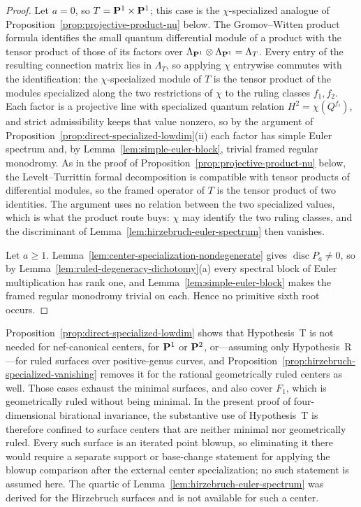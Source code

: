 \begin{proof}
Let \(a=0\), so \(T=\mathbf P^1\times\mathbf P^1\); this case is the \(\chi\)-specialized
analogue of Proposition~\ref{prop:projective-product-nu} below.  The
Gromov--Witten product formula
\cite{BehrendProduct} identifies the small quantum differential module of a
product with the tensor product of those of its factors over
\(\Lambda_{\mathbf P^1}\otimes\Lambda_{\mathbf P^1}=\Lambda_T\).  Every entry of the
resulting connection matrix lies in \(\Lambda_T\), so applying \(\chi\)
entrywise commutes with the identification: the \(\chi\)-specialized module of
\(T\) is the tensor product of the modules specialized along the two
restrictions of \(\chi\) to the ruling classes \(f_1,f_2\).  Each factor is a
projective line with specialized quantum relation \(H^2=\chi(Q^{f_i})\), and strict
admissibility keeps that value nonzero, so by the argument of
Proposition~\ref{prop:direct-specialized-lowdim}(ii) each factor has simple Euler
spectrum and, by Lemma~\ref{lem:simple-euler-block}, trivial framed regular
monodromy.  As in the proof of
Proposition~\ref{prop:projective-product-nu} below, the Levelt--Turrittin formal
decomposition is compatible with tensor products of differential modules, so the
framed operator of \(T\) is the tensor product of two identities.  The argument uses no
relation between the two specialized values, which is what the product route
buys: \(\chi\) may identify the two ruling classes, and the discriminant of
Lemma~\ref{lem:hirzebruch-euler-spectrum} then vanishes.

Let \(a\ge1\).  Lemma~\ref{lem:center-specialization-nondegenerate} gives
\(\operatorname{disc}P_a\ne0\), so by
Lemma~\ref{lem:ruled-degeneracy-dichotomy}(a) every spectral block of Euler
multiplication has rank one, and Lemma~\ref{lem:simple-euler-block} makes the
framed regular monodromy trivial on each.  Hence no primitive sixth root occurs.
\end{proof}

\begin{remark}
\label{rem:tagging-scope}
Proposition~\ref{prop:direct-specialized-lowdim} shows that
Hypothesis~T is not needed for nef-canonical centers, for \(\mathbf P^1\) or
\(\mathbf P^2\), or---assuming only Hypothesis~R---for ruled surfaces over
positive-genus curves, and
Proposition~\ref{prop:hirzebruch-specialized-vanishing} removes it for the
rational geometrically ruled centers as well.  Those cases exhaust the minimal
surfaces, and also cover \(F_1\), which is geometrically ruled without being
minimal.  In the present proof of four-dimensional birational invariance, the
substantive use of Hypothesis~T is therefore confined to surface centers
that are neither minimal nor geometrically ruled.  Every such surface is an iterated point
blowup, so eliminating it there would require a separate support or base-change
statement for applying the blowup comparison after the external center
specialization; no such statement is assumed here.  The quartic of
Lemma~\ref{lem:hirzebruch-euler-spectrum} was derived for the Hirzebruch
surfaces and is not available for such a center.
\end{remark}


